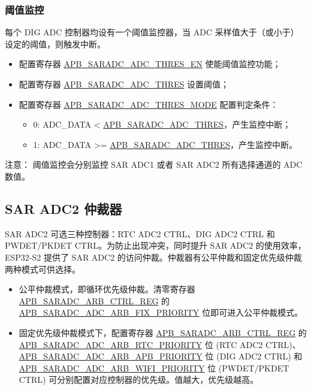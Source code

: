 \documentclass[main\_\_CN.tex]{subfiles}
\begin{document}
\subsubsection{阈值监控}
每个 DIG ADC 控制器均设有一个阈值监控器，当 ADC 采样值大于（或小于）设定的阈值，则触发中断。
\begin{itemize}
    \item 配置寄存器 \hyperref[fielddesc:APBSARADCADC1THRESEN]{APB\_SARADC\_ADC\_THRES\_EN} 使能阈值监控功能；
    \item 配置寄存器 \hyperref[fielddesc:APBSARADCADC1THRES]{APB\_SARADC\_ADC\_THRES} 设置阈值；
    \item 配置寄存器 \hyperref[fielddesc:APBSARADCADC1THRESMODE]{APB\_SARADC\_ADC\_THRES\_MODE} 配置判定条件：
    \begin{itemize}
        \item 0: ADC\_DATA < \hyperref[fielddesc:APBSARADCADC1THRES]{APB\_SARADC\_ADC\_THRES}，产生监控中断；
        \item 1: ADC\_DATA >= \hyperref[fielddesc:APBSARADCADC1THRES]{APB\_SARADC\_ADC\_THRES}，产生监控中断。
    \end{itemize}
\end{itemize}
注意：
    阈值监控会分别监控 SAR ADC1 或者 SAR ADC2 所有选择通道的 ADC 数值。

\subsection{SAR ADC2 仲裁器}

SAR ADC2 可选三种控制器：RTC ADC2 CTRL、DIG ADC2 CTRL 和 PWDET/PKDET CTRL。为防止出现冲突，同时提升 SAR ADC2 的使用效率，ESP32-S2 提供了 SAR ADC2 的访问仲裁。仲裁器有公平仲裁和固定优先级仲裁两种模式可供选择。

\begin{itemize}
    \item 公平仲裁模式，即循环优先级仲裁。清零寄存器 \hyperref[regdesc:APBSARADCAPBADCARBCTRLREG]{APB\_SARADC\_ARB\_CTRL\_REG} 的 \hyperref[fielddesc:APBSARADCADCARBFIXPRIORITY]{APB\_SARADC\_ADC\_ARB\_FIX\_PRIORITY} 位即可进入公平仲裁模式。
    \item 固定优先级仲裁模式下，配置寄存器 \hyperref[regdesc:APBSARADCAPBADCARBCTRLREG]{APB\_SARADC\_ARB\_CTRL\_REG} 的 \hyperref[fielddesc:APBSARADCADCARBRTCPRIORITY]{APB\_SARADC\_ADC\_ARB\_RTC\_PRIORITY} 位 (RTC ADC2 CTRL)、\hyperref[fielddesc:APBSARADCADCARBAPBPRIORITY]{APB\_SARADC\_ADC\_ARB\_APB\_PRIORITY} 位 (DIG ADC2 CTRL) 和 \hyperref[fielddesc:APBSARADCADCARBWIFIPRIORITY]{APB\_SARADC\_ADC\_ARB\_WIFI\_PRIORITY} 位 (PWDET/PKDET CTRL)
   可分别配置对应控制器的优先级。值越大，优先级越高。
\end{itemize}
\end{document}
